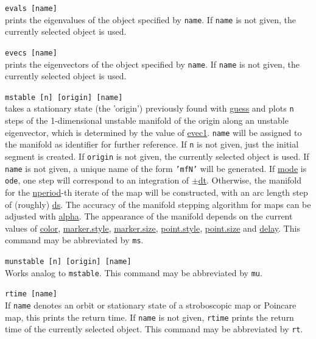 \documentclass[10pt,a4paper,titlepage]{article}
\newcommand{\cmd}[2]{\item{\T{\hypertarget{#1}{#1}\index[index]{#1} #2}}}
\newcommand{\HL}[1]{\hyperlink{#1}{#1}}
\newcommand{\T}[1]{\texttt{#1}}
\begin{document}
\begin{description}
\cmd{evals}{[name]}\\
prints the eigenvalues of the object specified by \T{name}. If \T{name} is not given, the currently selected object is used.  
\cmd{evecs}{[name]}\\
prints the eigenvectors of the object specified by \T{name}. If \T{name} is not given, the currently selected object is used.  
\cmd{mstable}{[n] [origin] [name]}\\takes a stationary state (the 'origin') previously found with \HL{guess} and plots \T{n} steps of the 1-dimensional unstable manifold of the origin along an unstable eigenvector, which is determined by the value of \HL{evec1}.  \T{name} will be assigned to the manifold as identifier for further reference. If \T{n} is not given, just the initial segment is created. If \T{origin} is not given, the currently selected object is used. If \T{name} is not given, a unique name of the form \T{'mfN'} will be generated. If \HL{mode} is \T{ode}, one step will correspond to an integration of $\pm$\HL{dt}. Otherwise, the manifold for the \HL{nperiod}-th iterate of the map will be constructed, with an arc length step of (roughly) \HL{ds}. The accuracy of the manifold stepping algorithm for maps can be adjusted with \HL{alpha}. The appearance of the manifold depends on the current values of \HL{color}, \HL{marker.style}, \HL{marker.size}, \HL{point.style}, \HL{point.size} and \HL{delay}. This command may be abbreviated by \T{ms}.
\cmd{munstable}{[n] [origin] [name]}\\
Works analog to \T{mstable}. This command may be abbreviated by \T{mu}.
\cmd{rtime}{[name]}\\
If \T{name} denotes an orbit or stationary state of a stroboscopic map or Poincare map, this prints the return time. If \T{name} is not given, \T{rtime} prints the return time of the currently selected object. This command may be abbreviated by \T{rt}.
\end{description}
\end{document}
